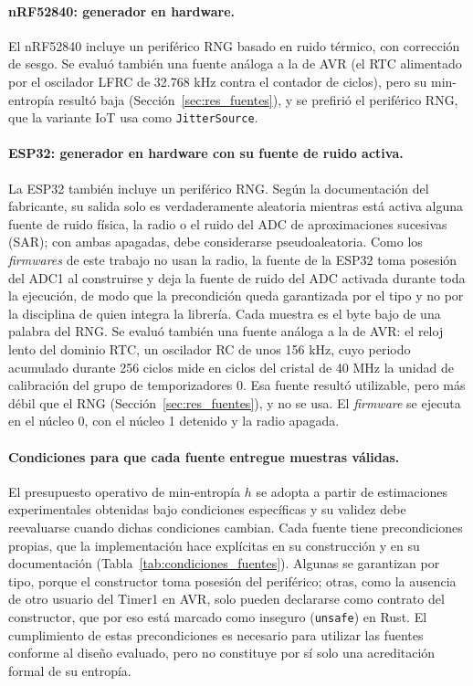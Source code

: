 \paragraph{nRF52840: generador en hardware.} El nRF52840 incluye un periférico RNG basado en ruido térmico, con corrección de sesgo. Se evaluó también una fuente análoga a la de AVR (el RTC alimentado por el oscilador LFRC de 32.768 kHz contra el contador de ciclos), pero su min-entropía resultó baja (Sección~\ref{sec:res_fuentes}), y se prefirió el periférico RNG, que la variante IoT usa como \texttt{JitterSource}.

\paragraph{ESP32: generador en hardware con su fuente de ruido activa.} La ESP32 también incluye un periférico RNG. Según la documentación del fabricante, su salida solo es verdaderamente aleatoria mientras está activa alguna fuente de ruido física, la radio o el ruido del ADC de aproximaciones sucesivas (SAR); con ambas apagadas, debe considerarse pseudoaleatoria. Como los \textit{firmwares} de este trabajo no usan la radio, la fuente de la ESP32 toma posesión del ADC1 al construirse y deja la fuente de ruido del ADC activada durante toda la ejecución, de modo que la precondición queda garantizada por el tipo y no por la disciplina de quien integra la librería. Cada muestra es el byte bajo de una palabra del RNG. Se evaluó también una fuente análoga a la de AVR: el reloj lento del dominio RTC, un oscilador RC de unos 156 kHz, cuyo periodo acumulado durante 256 ciclos mide en ciclos del cristal de 40 MHz la unidad de calibración del grupo de temporizadores 0. Esa fuente resultó utilizable, pero más débil que el RNG (Sección~\ref{sec:res_fuentes}), y no se usa. El \textit{firmware} se ejecuta en el núcleo 0, con el núcleo 1 detenido y la radio apagada.

\paragraph{Condiciones para que cada fuente entregue muestras válidas.} El presupuesto operativo de min-entropía $h$ se adopta a partir de estimaciones experimentales obtenidas bajo condiciones específicas y su validez debe reevaluarse cuando dichas condiciones cambian. Cada fuente tiene precondiciones propias, que la implementación hace explícitas en su construcción y en su documentación (Tabla~\ref{tab:condiciones_fuentes}). Algunas se garantizan por tipo, porque el constructor toma posesión del periférico; otras, como la ausencia de otro usuario del Timer1 en AVR, solo pueden declararse como contrato del constructor, que por eso está marcado como inseguro (\texttt{unsafe}) en Rust. El cumplimiento de estas precondiciones es necesario para utilizar las fuentes conforme al diseño evaluado, pero no constituye por sí solo una acreditación formal de su entropía.

